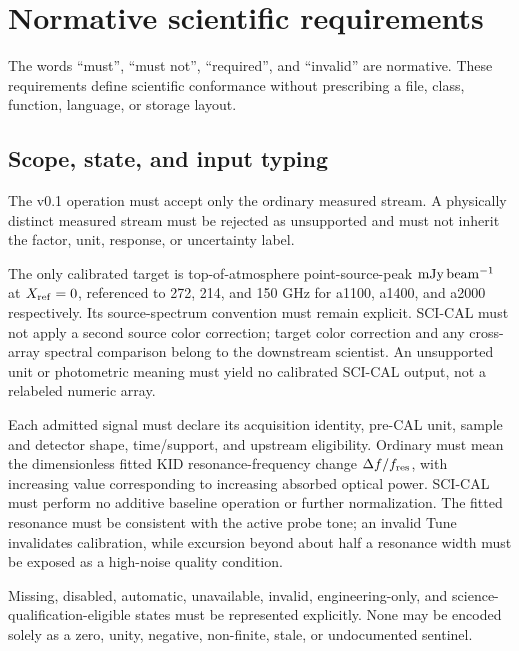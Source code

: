 \section{Normative scientific requirements}
\label{sec:requirements}

The words ``must'', ``must not'', ``required'', and ``invalid'' are normative.
These requirements define scientific conformance without prescribing a file,
class, function, language, or storage layout.

\subsection{Scope, state, and input typing}

\begin{description}[style=nextline]
\item[\Req{001}: measured-channel scope.]
  The v0.1 operation must accept only the ordinary  measured stream.
  A physically distinct measured stream must be rejected as unsupported and
  must not inherit the  factor, unit, response, or uncertainty label.

\item[\Req{002}: target-unit scope.]
  The only calibrated target is top-of-atmosphere point-source-peak
  \(\mathrm{mJy\,beam^{-1}}\) at \(X_{\rm ref}=0\), referenced to 272, 214, and 150 GHz for
  a1100, a1400, and a2000 respectively. Its source-spectrum convention must
  remain explicit. SCI-CAL must not apply a second source color correction;
  target color correction and any cross-array spectral comparison belong to
  the downstream scientist. An unsupported unit or photometric meaning must
  yield no calibrated SCI-CAL output, not a relabeled numeric array.

\item[\Req{003}: complete signal declaration.]
  Each admitted signal must declare its acquisition identity, pre-CAL unit,
  sample and detector shape, time/support, and upstream eligibility. Ordinary
   must mean the dimensionless fitted KID resonance-frequency change
  \(\Delta f/f_{\rm res}\), with increasing value corresponding to increasing
  absorbed optical power. SCI-CAL must perform no additive baseline operation
  or further normalization. The fitted resonance must be consistent with the
  active probe tone; an invalid Tune invalidates calibration, while excursion
  beyond about half a resonance width must be exposed as a high-noise quality
  condition.

\item[\Req{004}: explicit semantic states.]
  Missing, disabled, automatic, unavailable, invalid, engineering-only, and
  science-qualification-eligible states must be represented explicitly. None
  may be encoded solely as a zero, unity, negative, non-finite, stale, or
  undocumented sentinel.


\end{description}
